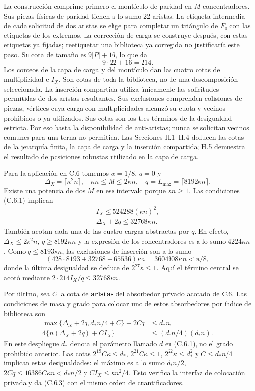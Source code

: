 \documentclass[spanish,11pt,a4paper]{article}
\begin{document}
La construcción comprime primero el montículo de paridad en \(M\) concentradores. Sus piezas físicas de paridad tienen a lo sumo 22 aristas. La etiqueta intermedia de cada solicitud de dos aristas se elige para completar un triángulo de \(F_0\) con las etiquetas de los extremos. La corrección de carga se construye después, con estas etiquetas ya fijadas; reetiquetar una biblioteca ya corregida no justificaría este paso. Su cota de tamaño es \(9|P|+16\), lo que da \[9\cdot22+16=214.\] Los conteos de la capa de carga y del montículo dan las cuatro cotas de multiplicidad e \(I_X\). Son cotas de toda la biblioteca, no de una descomposición seleccionada. La inserción compartida utiliza únicamente las solicitudes permitidas de dos aristas resultantes. Sus exclusiones comprenden colisiones de piezas, vértices cuya carga con multiplicidades alcanzó su cuota y vecinos prohibidos o ya utilizados. Sus cotas son los tres términos de la desigualdad estricta. Por eso basta la disponibilidad de anti-aristas; nunca se solicitan vecinos comunes para una terna no permitida. Las Secciones H.1--H.4 deducen las cotas de la jerarquía finita, la capa de carga y la inserción compartida; H.5 demuestra el resultado de posiciones robustas utilizado en la capa de carga.

Para la aplicación en C.6 tomemos \(\alpha=1/8\), \(d=0\) y \[\Delta_X=\lceil\kappa^2n\rceil,\quad
\kappa n\le M\le2\kappa n,\quad
q=L_{\max}=\lceil8192\kappa n\rceil.\] Existe una potencia de dos \(M\) en ese intervalo porque \(\kappa n\ge1\). Las condiciones (C.6.1) implican \[\begin{gathered}
I_X\le524288(\kappa n)^2,\\
\Delta_X+2q\le32768\kappa n.
\end{gathered}\] También acotan cada una de las cuatro cargas abstractas por \(q\). En efecto, \(\Delta_X\le2\kappa^2n\), \(q\ge8192\kappa n\) y la expresión de los concentradores es a lo sumo \(4224\kappa n\). Como \(q\le8193\kappa n\), las exclusiones de inserción son a lo sumo \[(428\cdot8193+32768+65536)\kappa n
=3604908\kappa n<n/8,\] donde la última desigualdad se deduce de \(2^{27}\kappa\le1\). Aquí el término central se acotó mediante \(2\cdot214I_X/q\le32768\kappa n\).

Por último, sea \(C\) la cota de \textbf{aristas} del absorbedor privado acotado de C.6. Las condiciones de masa y grado para colocar uno de estos absorbedores por índice de biblioteca son \[\begin{aligned}
\max\{\Delta_X+2q,d_*n/4+C\}+2Cq&\le d_*n,\\
4\{n(\Delta_X+2q)+CI_X\}&\le(d_*n/4)(d_*n).
\end{aligned}\] En este despliegue \(d_*\) denota el parámetro llamado \(d\) en (C.6.1), no el grado prohibido anterior. Las cotas \(2^{19}C\kappa\le d_*\), \(2^{21}C\kappa\le1\), \(2^{22}\kappa\le d_*^2\) y \(C\le d_*n/4\) implican estas desigualdades: el máximo es a lo sumo \(d_*n/2\), \(2Cq\le16386C\kappa n<d_*n/2\) y \(CI_X\le\kappa n^2/4\). Esto verifica la interfaz de colocación privada y da (C.6.3) con el mismo orden de cuantificadores.
\end{document}
